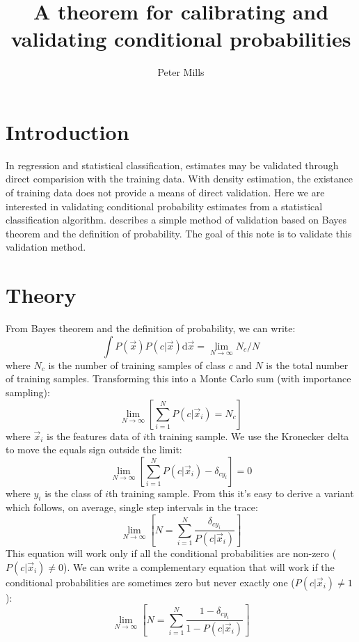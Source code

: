 \documentclass{article}
\begin{document}
\title{A theorem for calibrating and validating conditional probabilities}

\author{Peter Mills}

\maketitle

\section{Introduction}

In regression and statistical classification, estimates may be validated
through direct comparision with the training data.
With density estimation, the existance of training data does not provide
a means of direct validation.
Here we are interested in validating conditional probability estimates from a
statistical classification algorithm.
\citet{Mills2009} describes a simple method of validation based on Bayes
theorem and the definition of probability.
The goal of this note is to validate this validation method.

\section{Theory}

From Bayes theorem and the definition of probability, we can write:
\begin{equation}
	\int P(\vec x) P(c | \vec x) \mathrm d \vec x = \lim_{N \rightarrow \infty} N_c/N
\end{equation}
where $N_c$ is the number of training samples of class $c$ and $N$ is the 
total number of training samples.
Transforming this into a Monte Carlo sum (with importance sampling):
\begin{equation}
	\lim_{N \rightarrow \infty} \left [ \sum_{i=1}^N P(c | \vec x_i) = N_c \right ]
\end{equation}
where $\vec x_i$ is the features data of $i$th training sample.
We use the Kronecker delta 
to move the equals sign outside the limit:
\begin{equation}
	\lim_{N \rightarrow \infty} \left [ \sum_{i=1}^N P(c | \vec x_i) - \delta_{cy_i} \right ] = 0 \label{theorem}
\end{equation}
where $y_i$ is the class of $i$th training sample.
From this it's easy to derive a variant which follows, on average, 
single step intervals in the trace:
\begin{equation}
	\lim_{N \rightarrow \infty} \left [N = \sum_{i=1}^N \frac{\delta_{cy_i}}{P(c|\vec x_i)} \right ]
\end{equation}
This equation will work only if all the conditional probabilities 
are non-zero ($P(c|\vec x_i) \ne 0$).
We can write a complementary equation that will work
if the conditional probabilities are sometimes zero but never exactly one ($P(c|\vec x_i) \ne 1$):
\begin{equation}
	\lim_{N \rightarrow \infty} \left [N = \sum_{i=1}^N \frac{1-\delta_{cy_i}}{1-P(c|\vec x_i)} \right ]
\end{equation}
\end{document}
